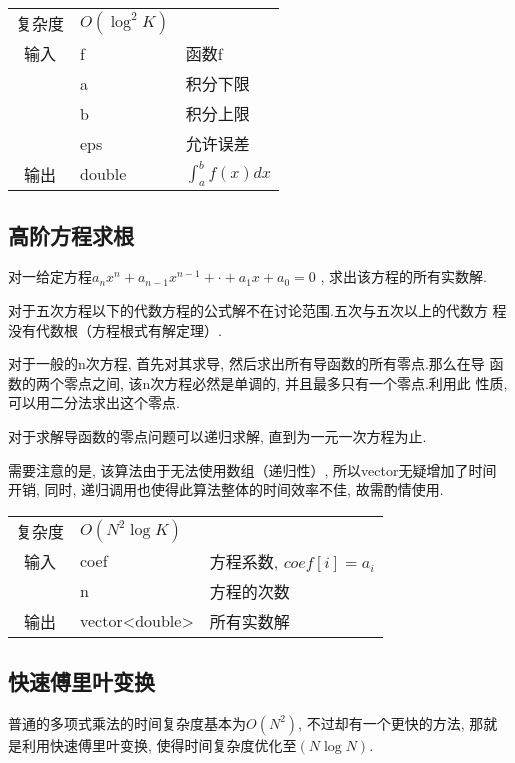\begin{longtable}{|c|l|l|}
复杂度 & $O({\log}^{2} K)$ &  \\
输入 & f & 函数f \\
 & a & 积分下限 \\
 & b & 积分上限 \\
 & eps & 允许误差 \\ 
输出 & double & $\int_{a} ^{b} f(x)  dx$ \\ 
\end{longtable}



    \subsection{高阶方程求根}\small
对一给定方程$a_{n}x^{n} + a_{n-1}x^{n-1} + \cdot + a_{1}x + a_{0} = 0$
, 求出该方程的所有实数解.

对于五次方程以下的代数方程的公式解不在讨论范围.五次与五次以上的代数方
程没有代数根（方程根式有解定理）.

对于一般的n次方程, 首先对其求导, 然后求出所有导函数的所有零点.那么在导
函数的两个零点之间, 该n次方程必然是单调的, 并且最多只有一个零点.利用此
性质, 可以用二分法求出这个零点.

对于求解导函数的零点问题可以递归求解, 直到为一元一次方程为止.

需要注意的是, 该算法由于无法使用数组（递归性）, 所以vector无疑增加了时间
开销, 同时, 递归调用也使得此算法整体的时间效率不佳, 故需酌情使用.

\begin{longtable}{|c|l|l|}
复杂度 & $O(N^{2}\log K)$ &  \\
输入 & coef & 方程系数, $coef[i] = a_{i}$ \\
 & n & 方程的次数 \\
输出 & vector<double> & 所有实数解 \\ 
\end{longtable}



    \subsection{快速傅里叶变换}\small
普通的多项式乘法的时间复杂度基本为$O(N^2)$, 不过却有一个更快的方法, 那就
是利用快速傅里叶变换, 使得时间复杂度优化至$(N\log N)$.

